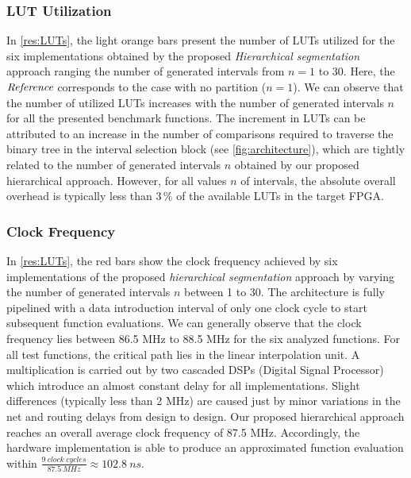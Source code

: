 \subsubsection{LUT Utilization}\label{sec:results:LUTs}
In \cref{res:LUTs}, the light orange bars present the number of LUTs utilized for the six implementations obtained by the proposed {\textit{Hierarchical segmentation}} approach ranging the number of generated intervals from $n=1$ to $30$.
Here, the $\textit{Reference}$ corresponds to the case with no partition ($n=1$).
We can observe that the number of utilized LUTs increases with the number of generated intervals $n$ for all the presented benchmark functions.
The increment in LUTs can be attributed to an increase in the number of comparisons required to traverse the binary tree in the interval selection block (see \cref{fig:architecture}), which are tightly related to the number of generated intervals $n$ obtained by our proposed hierarchical approach.
However, {for all values $n$ of intervals, the {absolute} overall overhead is typically less than} $3\,\%$ of the available LUTs in the target FPGA.
\subsubsection{{Clock} Frequency}
In \cref{res:LUTs}, the red bars show the {clock} frequency {achieved} by six implementations of the proposed \textit{hierarchical segmentation} approach by varying the number of generated intervals $n$ between 1 to 30. {The architecture is fully pipelined with a data introduction interval of only one clock cycle to start subsequent function evaluations.}
We can generally observe that the {clock} frequency lies between 86.5 MHz to 88.5 MHz for the six analyzed functions. 
For all test functions, the critical path lies in the linear interpolation unit. 
A multiplication is carried out by two cascaded DSPs (Digital Signal Processor) which introduce an almost constant delay for all implementations. Slight differences (typically less than 2 MHz) are caused just by minor variations in the net and routing delays from design to design.
Our proposed hierarchical approach reaches an overall average {clock} frequency of 87.5 MHz. 
Accordingly, the hardware implementation is able to produce an approximated function evaluation {within} $\frac{9\ clock\ cycles}{87.5\ MHz}\approx102.8\ ns$.
